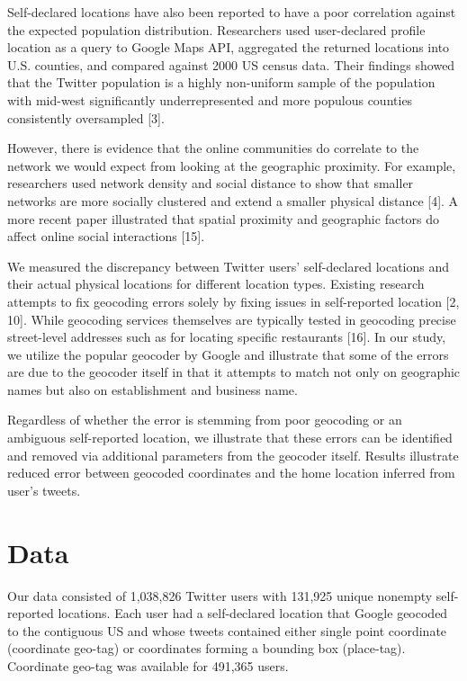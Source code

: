 Self-declared locations have also been reported to have a poor correlation against the expected population distribution. Researchers used user-declared profile location as a query to Google Maps API, aggregated the returned locations into U.S. counties, and compared against 2000 US census data. Their findings showed that the Twitter population is a highly non-uniform sample of the population with mid-west significantly underrepresented and more populous counties consistently oversampled [3].

However, there is evidence that the online communities do correlate to the network we would expect from looking at the geographic proximity. For example, researchers used network density and social distance to show that smaller networks are more socially clustered and extend a smaller physical distance [4]. A more recent paper illustrated that spatial proximity and geographic factors do affect online social interactions [15]. 

We measured the discrepancy between Twitter users' self-declared locations and their actual physical locations for different location types. Existing research attempts to fix geocoding errors solely by fixing issues in self-reported location [2, 10]. While geocoding services themselves are typically tested in geocoding precise street-level addresses such as for locating specific restaurants [16]. In our study, we utilize the popular geocoder by Google and illustrate that some of the errors are due to the geocoder itself in that it attempts to match not only on geographic names but also on establishment and business name. 

Regardless of whether the error is stemming from poor geocoding or an ambiguous self-reported location, we illustrate that these errors can be identified and removed via additional parameters from the geocoder itself. Results illustrate reduced error between geocoded coordinates and the home location inferred from user's tweets. 

\section{Data}
Our data consisted of 1,038,826 Twitter users with 131,925 unique nonempty self-reported locations. Each user had a self-declared location that Google geocoded to the contiguous US and whose tweets contained either single point coordinate (coordinate geo-tag) or coordinates forming a bounding box (place-tag). Coordinate geo-tag was available for 491,365 users. 

